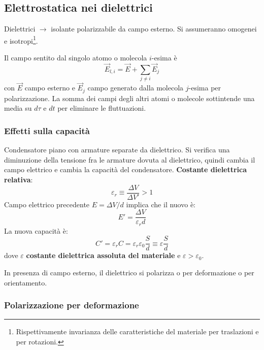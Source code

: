 \documentclass[10pt, a4paper]{scrartcl}
\numberwithin{equation}{subsection}
\theoremstyle{style1}
\begin{document}
\subsection{Elettrostatica nei dielettrici}
Dielettrici $\to$ isolante polarizzabile da campo esterno. Si assumeranno omogenei e isotropi\footnote{Rispettivamente invarianza delle caratteristiche del materiale per traslazioni e per rotazioni.}.

Il campo sentito dal singolo atomo o molecola $i$-esima \`e
\begin{equation}
	\vec{E}_{l,i} = \vec{E}+\sum_{j\neq i}^{} \vec{E}_j
\end{equation}
con $\vec{E}$ campo esterno e $\vec{E}_j$ campo generato dalla molecola $j$-esima per polarizzazione. La somma dei campi degli altri atomi o molecole sottintende una media su $d\tau $ e $dt$ per eliminare le fluttuazioni.
\subsubsection{Effetti sulla capacit\`a}
Condensatore piano con armature separate da dielettrico. Si verifica una diminuzione della tensione fra le armature dovuta al dielettrico, quindi cambia il campo elettrico e cambia la capacit\`a del condensatore. \textbf{Costante dielettrica relativa}:
\begin{equation}
	\varepsilon _r \equiv \frac{\Delta V}{\Delta V'} >1
\end{equation}
Campo elettrico precedente $E=\Delta V / d$ implica che il nuovo \`e:
\begin{equation}
	E' = \frac{\Delta V}{\varepsilon _r d}
\end{equation}
La nuova capacit\`a \`e:
\begin{equation}
	C' = \varepsilon _r C = \varepsilon _r \varepsilon _0 \frac{S}{d} \equiv \varepsilon  \frac{S}{d}
\end{equation}
dove $\varepsilon $ \textbf{costante dielettrica assoluta del materiale} e $\varepsilon >\varepsilon _0$. 

In presenza di campo esterno, il dielettrico si polarizza o per deformazione o per orientamento.
\subsubsection{Polarizzazione per deformazione}
\end{document}
